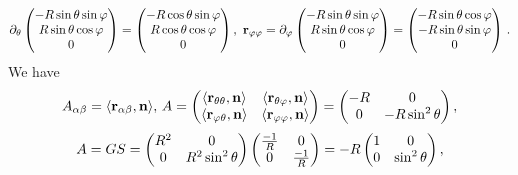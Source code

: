 \documentclass[12pt]{article}
\theoremstyle{theorem}
\numberwithin{equation}{section}
\begin{document}
             $$
             \partial_\theta
       \begin{pmatrix}
        -R\sin\theta\sin\varphi\\
        R\sin\theta\cos\varphi\\
          0\\
   \end{pmatrix}=\begin{pmatrix}
        -R\cos\theta\sin\varphi\\
        R\cos\theta\cos\varphi\\
          0\\
   \end{pmatrix},\,\,
   {\bf r}_{\varphi \varphi}=\partial_\varphi
       \begin{pmatrix}
        -R\sin\theta\sin\varphi\\
          R\sin\theta\cos\varphi\\
          0\\
   \end{pmatrix}=\begin{pmatrix}
        -R\sin\theta\cos\varphi\\
        -R\sin\theta\sin\varphi\\
          0\\
   \end{pmatrix}\,.
                      $$
We have
                    \begin{equation}\label{secquadrformforcylinder}
            A_{\alpha\beta}=\langle{\bf r}_{\alpha\beta},{\bf n}\rangle,\,
              A=\begin{pmatrix}\langle{\bf r}_{\theta\theta},{\bf n}\rangle&\langle{\bf r}_{\theta\varphi},{\bf n}\rangle\cr
                               \langle{\bf r}_{\varphi \theta},{\bf n}\rangle &\langle{\bf r}_{\varphi\varphi},{\bf n}\rangle\cr
                                   \end{pmatrix}=
                                   \begin{pmatrix}-R&0\cr
                                0&-R\sin^2\theta\cr
                                   \end{pmatrix},
                    \end{equation}
                    $$
       A=GS=\begin{pmatrix}R^2&0\cr
                                0&R^2\sin^2\theta\cr
                                   \end{pmatrix}
                                   \begin{pmatrix}{-1\over R}&0\cr
                                0&{-1\over R}\cr
                                   \end{pmatrix}=
                                       -R
                                  \begin{pmatrix}1&0\cr
                                0&\sin^2\theta\cr
                                   \end{pmatrix},
                    $$
\end{document}
